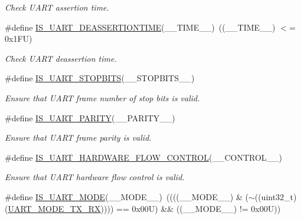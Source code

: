 \begin{DoxyCompactItemize}
\begin{DoxyCompactList}\small\item\em Check U\+A\+RT assertion time. \end{DoxyCompactList}\item 
\#define \mbox{\hyperlink{group___u_a_r_t___private___macros_ga7e060b24713e3fb49f4f0f4fa71dd85f}{I\+S\+\_\+\+U\+A\+R\+T\+\_\+\+D\+E\+A\+S\+S\+E\+R\+T\+I\+O\+N\+T\+I\+ME}}(\+\_\+\+\_\+\+T\+I\+M\+E\+\_\+\+\_\+)~((\+\_\+\+\_\+\+T\+I\+M\+E\+\_\+\+\_\+) $<$= 0x1\+F\+U)
\begin{DoxyCompactList}\small\item\em Check U\+A\+RT deassertion time. \end{DoxyCompactList}\item 
\#define \mbox{\hyperlink{group___u_a_r_t___private___macros_ga0fa4dec621a59f8c07f42548cdbb7f18}{I\+S\+\_\+\+U\+A\+R\+T\+\_\+\+S\+T\+O\+P\+B\+I\+TS}}(\+\_\+\+\_\+\+S\+T\+O\+P\+B\+I\+T\+S\+\_\+\+\_\+)
\begin{DoxyCompactList}\small\item\em Ensure that U\+A\+RT frame number of stop bits is valid. \end{DoxyCompactList}\item 
\#define \mbox{\hyperlink{group___u_a_r_t___private___macros_ga57b0798bfa43d210f492eb3c5e218a86}{I\+S\+\_\+\+U\+A\+R\+T\+\_\+\+P\+A\+R\+I\+TY}}(\+\_\+\+\_\+\+P\+A\+R\+I\+T\+Y\+\_\+\+\_\+)
\begin{DoxyCompactList}\small\item\em Ensure that U\+A\+RT frame parity is valid. \end{DoxyCompactList}\item 
\#define \mbox{\hyperlink{group___u_a_r_t___private___macros_ga92977d9daf0c39d875df200ae0ae6acd}{I\+S\+\_\+\+U\+A\+R\+T\+\_\+\+H\+A\+R\+D\+W\+A\+R\+E\+\_\+\+F\+L\+O\+W\+\_\+\+C\+O\+N\+T\+R\+OL}}(\+\_\+\+\_\+\+C\+O\+N\+T\+R\+O\+L\+\_\+\+\_\+)
\begin{DoxyCompactList}\small\item\em Ensure that U\+A\+RT hardware flow control is valid. \end{DoxyCompactList}\item 
\#define \mbox{\hyperlink{group___u_a_r_t___private___macros_gae5b637b9191dea1f8fd3846b886dd38b}{I\+S\+\_\+\+U\+A\+R\+T\+\_\+\+M\+O\+DE}}(\+\_\+\+\_\+\+M\+O\+D\+E\+\_\+\+\_\+)~((((\+\_\+\+\_\+\+M\+O\+D\+E\+\_\+\+\_\+) \& ($\sim$((uint32\+\_\+t)(\mbox{\hyperlink{group___u_a_r_t___mode_gab47c162935901e89322e2ce6700b6744}{U\+A\+R\+T\+\_\+\+M\+O\+D\+E\+\_\+\+T\+X\+\_\+\+RX}})))) == 0x00\+U) \&\& ((\+\_\+\+\_\+\+M\+O\+D\+E\+\_\+\+\_\+) != 0x00\+U))

\end{DoxyCompactItemize}
